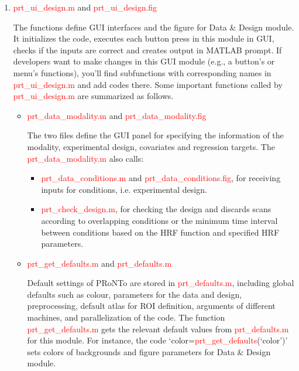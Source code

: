 \begin{enumerate}

\item \textcolor{red}{prt\_ui\_design.m} and \textcolor{red}{prt\_ui\_design.fig}

The functions define GUI interfaces and the figure for Data \& Design module. It initializes the code, executes each button press in this module in GUI, checks if the inputs are correct and creates output in MATLAB prompt. If developers want to make changes in this GUI module (e.g., a button’s or menu’s functions), you’ll find subfunctions with corresponding names in \textcolor{red}{prt\_ui\_design.m} and add codes there. %
Some important functions called by \textcolor{red}{prt\_ui\_design.m} are summarized as follows.

\begin{itemize}
\item \textcolor{red}{prt\_data\_modality.m} and \textcolor{red}{prt\_data\_modality.fig}

The two files define the GUI panel for specifying the information of the modality, experimental design, covariates and regression targets. The \textcolor{red}{prt\_data\_modality.m}  also calls:

\begin{itemize}
\item \textcolor{red}{prt\_data\_conditions.m} and \textcolor{red}{prt\_data\_conditions.fig}, for receiving inputs for conditions, i.e. experimental design.
\item \textcolor{red}{prt\_check\_design.m}, for checking the design and discards scans according to overlapping conditions or the minimum time interval between conditions based on the HRF function and specified HRF parameters.
\end{itemize}

\item \textcolor{red}{prt\_get\_defaults.m} and \textcolor{red}{prt\_defaults.m}

Default settings of PRoNTo are stored in \textcolor{red}{prt\_defaults.m}, including global defaults such as colour, parameters for the data and design, preprocessing, default atlas for ROI definition, arguments of different machines, and parallelization of the code. The function \textcolor{red}{prt\_get\_defaults.m} gets the relevant default values from \textcolor{red}{prt\_defaults.m} for this module. For instance, the code `color=\textcolor{red}{prt\_get\_defaults}(`color')' sets colors of backgrounds and figure parameters for Data \& Design module.


\end{itemize}
\end{enumerate}
